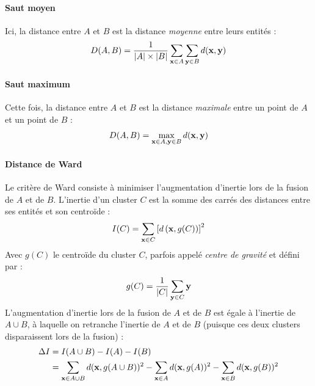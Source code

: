 \paragraph{Saut moyen}

Ici, la distance entre $A$ et $B$ est la distance \textit{moyenne} entre leurs entités :
\begin{equation}
    D(A, B) = \frac{1}{|A| \times |B|} \sum_{\bf{x} \in A} \sum_{\bf{y} \in B} d(\bf{x}, \bf{y})
\end{equation}

\paragraph{Saut maximum}

Cette fois, la distance entre $A$ et $B$ est la distance \textit{maximale} entre un point de $A$ et un point de $B$ :
\begin{equation}
    D(A, B) = \max_{\bf{x} \in A, \bf{y} \in B} d(\bf{x}, \bf{y})
\end{equation}

\paragraph{Distance de Ward}

Le critère de Ward consiste à minimiser l'augmentation d'inertie lors de la fusion de $A$ et de $B$. L'inertie d'un cluster $C$ est la somme des carrés des distances entre ses entités et son centroïde :
\begin{equation}
    I(C) = \sum_{\bf{x} \in C} \left[d\left(\bf{x}, g(C)\right)\right]^2
\end{equation}
Avec $g(C)$ le centroïde du cluster $C$, parfois appelé \textit{centre de gravité} et défini par :
\begin{equation}
    g(C) = \frac{1}{|C|} \sum_{\bf{y} \in C} \bf{y}
\end{equation}
L'augmentation d'inertie lors de la fusion de $A$ et de $B$ est égale à l'inertie de $A \cup B$, à laquelle on retranche l'inertie de $A$ et de $B$ (puisque ces deux clusters disparaissent lors de la fusion) :
\begin{align}
    \Delta I &= I(A \cup B) - I(A) - I(B) \nonumber \\
    &= \sum_{\bf{x} \in A\cup B} d(\bf{x}, g(A \cup B) )^2
    - \sum_{\bf{x} \in A} d(\bf{x}, g(A) )^2
    - \sum_{\bf{x} \in B} d(\bf{x}, g(B) )^2
    \label{eq:te-ward-1}
\end{align}

